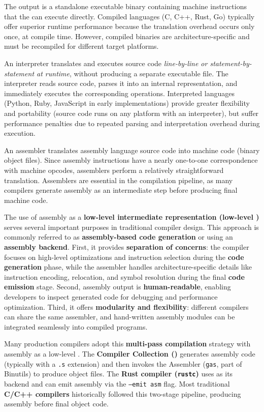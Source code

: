 \begin{description}
  The output is a standalone executable binary containing machine instructions that the  can execute directly. Compiled languages (C, C++, Rust, Go) typically offer superior runtime performance because the translation overhead occurs only once, at compile time. However, compiled binaries are architecture-specific and must be recompiled for different target platforms.

  \item[\textbf{Interpreter}] An interpreter translates and executes source code \textit{line-by-line or statement-by-statement at runtime}, without producing a separate executable file. The interpreter reads source code, parses it into an internal representation, and immediately executes the corresponding operations. Interpreted languages (Python, Ruby, JavaScript in early implementations) provide greater flexibility and portability (source code runs on any platform with an interpreter), but suffer performance penalties due to repeated parsing and interpretation overhead during execution.

  \item[\textbf{Assembler}] An assembler translates assembly language source code into machine code (binary object files). Since assembly instructions have a nearly one-to-one correspondence with machine opcodes, assemblers perform a relatively straightforward translation. Assemblers are essential in the compilation pipeline, as many compilers generate assembly as an intermediate step before producing final machine code.

  The use of assembly as a \textbf{low-level intermediate representation (low-level )} serves several important purposes in traditional compiler design. This approach is commonly referred to as \textbf{assembly-based code generation} or using an \textbf{assembly backend}. First, it provides \textbf{separation of concerns}: the compiler focuses on high-level optimizations and instruction selection during the \textbf{code generation} phase, while the assembler handles architecture-specific details like instruction encoding, relocation, and symbol resolution during the final \textbf{code emission} stage. Second, assembly output is \textbf{human-readable}, enabling developers to inspect generated code for debugging and performance optimization. Third, it offers \textbf{modularity and flexibility}: different compilers can share the same assembler, and hand-written assembly modules can be integrated seamlessly into compiled programs.

  Many production compilers adopt this \textbf{multi-pass compilation} strategy with assembly as a low-level . The \textbf{ Compiler Collection ()} generates assembly code (typically with a \texttt{.s} extension) and then invokes the  Assembler (\texttt{gas}, part of  Binutils) to produce object files. The \textbf{Rust compiler (\texttt{rustc})} uses  as its backend and can emit assembly via the \texttt{--emit asm} flag. Most traditional \textbf{C/C++ compilers} historically followed this two-stage pipeline, producing assembly before final object code.


\end{description}
